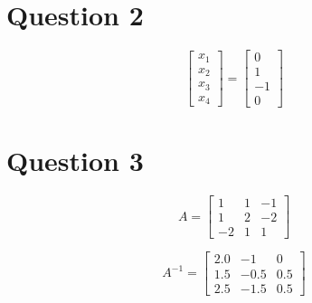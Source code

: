\documentclass{article}
\begin{document}
\section*{Question 2}

\begin{Large}
$$
\begin{bmatrix}
x_1 \\
x_2 \\
x_3 \\
x_4
\end{bmatrix}
=
\begin{bmatrix}
0 \\
1 \\
-1 \\
0
\end{bmatrix}
$$
\end{Large}

\section*{Question 3}

\begin{Large}
$$
A =
\begin{bmatrix}
1 & 1 & -1\\
1 & 2 & -2\\
-2 & 1 & 1
\end{bmatrix}
$$
\end{Large}


\begin{Large}
$$
A^{-1} =
\begin{bmatrix}
    2.0 & -1  & 0\\
    1.5  & -0.5   & 0.5\\
    2.5   &-1.5  &  0.5
\end{bmatrix}
$$
\end{Large}
\end{document}
